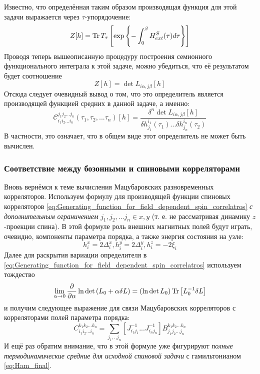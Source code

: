 Известно, что определённая таким образом производящая функция для этой задачи выражается через $\tau$-упорядочение:
$$
Z[h] = \operatorname{Tr} T_\tau \left[ \exp \left\{ -\int_0^\beta H^S_{ext}(\tau) d\tau \right\}  \right]
$$
Проводя теперь вышеописанную процедуру построения семионного функционального интеграла к этой задаче, можно убедиться, что её результатом будет соотношение
$$
Z[h] = \det L_{i\alpha,j\beta} [h]
$$
Отсюда следует очевидный вывод о том, что это определитель является производящей функцией средних в данной задаче, а именно:
\begin{equation}
	\label{eq:Generating_function_for_field_dependent_spin_correlatros}
	\mathcal{C}^{j_1 j_2 ... j_n}_{i_1 i_2 ... i_n} \left( \tau_1, \tau_2, ... \tau_n \right)[h] = \frac{\delta^n \det L_{i\alpha,j\beta} [h] }{\delta h^{i_1}_{j_1}(\tau_1) ... \delta h^{i_n}_{j_n}(\tau_2) }
\end{equation}
В частности, это означает, что в общем виде этот определитель не может быть вычислен.


\subsubsection{Соответствие между бозонными и спиновыми корреляторами}
Вновь вернёмся к теме вычисления Мацубаровских разновременных корреляторов. Используем формулу для производящей функции спиновых корреляторов \eqref{eq:Generating_function_for_field_dependent_spin_correlatros} \textit{с дополнительным ограничением} $j_1, j_2, ...j_n \in {x, y}$ (т. е. не рассматривая динамику $z$-проекции спина). В этой формуле роль внешних магнитных полей будут играть, очевидно, компоненты параметра порядка, а также энергия состояния на узле:
$$
h^x_i = 2\Delta^x_i, h^y_i = 2\Delta^y_i, h^z_i = - 2\xi_i
$$
Далее для раскрытия вариации определителя в \eqref{eq:Generating_function_for_field_dependent_spin_correlatros} используем тождество
$$
\lim_{\alpha \rightarrow 0} \frac{\partial}{\partial \alpha} \ln \det \left(L_0 + \alpha \delta L \right) = \left( \ln \det L_0 \right) \operatorname{Tr} \left[ L_0^{-1} \delta L \right]
$$
и получим следующее выражение для связи Мацубаровских корреляторов с корреляторами полей параметра порядка:
\begin{equation}
	\label{eq:Spin_Boson_correlators_correspondence}
	C^{k_1 k_2 ... k_n}_{i_1 i_2 ... i_n} = \sum_{j_1,..j_n} \left[ J_{i_1 j_1}^{-1}...J_{i_n j_n}^{-1} \right] B^{k_1 k_2 ... k_n}_{j_1 j_2 ... j_n}
\end{equation}
И ещё раз обратим внимание, что в этой формуле уже фигурируют \textit{полные термодинамические средние для исходной спиновой задачи} с гамильтонианом \eqref{eq:Ham_final}.

